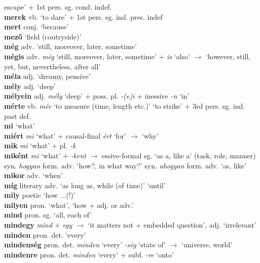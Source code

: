 \documentclass[11pt]{article}
\begin{document}
escape' + 1st pers. sg. cond. indef. \\
\textbf{merek} vb. \emph{} `to dare' + 1st pers. sg. ind. pres. indef \\
\textbf{mert} conj. `because' \\
\textbf{mező} `field (coutryside)' \\
\textbf{még} adv. `still, moreover, later, sometime' \\
\textbf{mégis} adv. \emph{még} `still, moreover, later, sometime'
+ \emph{is} `also' $\rightarrow$ `however, still, yet, but,
nevertheless, after all' \\
\textbf{méla} adj. `dreamy, pensive' \\
\textbf{mély} adj. `deep' \\
\textbf{mélyein} adj. \emph{mély} `deep' + poss. pl. \emph{-(e)i} +
inessive \emph{-n} `in' \\
\textbf{mérte} vb. \emph{mér} `to measure (time, length
etc.)' \textbar\textbar{} `to strike' + 3rd pers. sg. ind. past def. \\
\textbf{mi} `what' \\
\textbf{miért} \emph{mi} `what' + causal\hyp{}final \emph{ért} `for'
$\rightarrow$ `why' \\
\textbf{mik} \emph{mi} `what' + pl. \emph{-k} \\
\textbf{miként} \emph{mi} `what' + \emph{-kent} $\rightarrow$
essive\hyp{}formal sg. `as a, like a' (task, role,
manner) \textbar\textbar{} syn. \emph{hogyan} form. adv. `how?, in what way?' \textbar\textbar{} syn. \emph{ahogyan} form. adv. `as, like' \\
\textbf{mikor} adv. `when' \\
\textbf{míg} literary adv. `as long as, while (of
time)' \textbar\textbar{} `until' \\
\textbf{mily} poetic `how ...(!)' \\
\textbf{milyen} pron. `what', `how + adj. or adv.' \\
\textbf{mind} pron. sg. `all, each of' \\
\textbf{mindegy} \emph{mind} + \emph{egy} $\rightarrow$ `it matters not
+ embedded question', adj. `irrelevant' \\
\textbf{minden} pron. det. `every' \\
\textbf{mindenség} pron. det. \emph{minden} `every' \emph{-ség}
`state of' $\rightarrow$ `universe, world' \\
\textbf{mindenre} pron. det. \emph{minden} `every' + subl. \emph{-re}
`onto' \\
\end{document}
